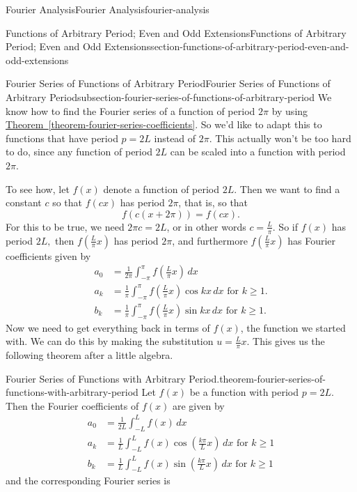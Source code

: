 \documentclass[oneside,10pt,]{book}
\numberwithin{equation}{section}
\newcommand{\amp}{&}
\begin{document}
\begin{chapterptx}{Fourier Analysis}{}{Fourier Analysis}{}{}{fourier-analysis}
\begin{sectionptx}{Functions of Arbitrary Period; Even and Odd Extensions}{}{Functions of Arbitrary Period; Even and Odd Extensions}{}{}{section-functions-of-arbitrary-period-even-and-odd-extensions}
\begin{subsectionptx}{Fourier Series of Functions of Arbitrary Period}{}{Fourier Series of Functions of Arbitrary Period}{}{}{subsection-fourier-series-of-functions-of-arbitrary-period}
\hypertarget{p-588}{}%
We know how to find the Fourier series of a function of period \(2\pi\) by using \hyperref[theorem-fourier-series-coefficients]{Theorem~\ref{theorem-fourier-series-coefficients}}. So we'd like to adapt this to functions that have period \(p = 2L\) instead of \(2\pi\). This actually won't be too hard to do, since any function of period \(2L\) can be scaled into a function with period \(2\pi\).%
\par
\hypertarget{p-589}{}%
To see how, let \(f(x)\) denote a function of period \(2L\). Then we want to find a constant \(c\) so that \(f(cx)\) has period \(2\pi\), that is, so that%
\begin{equation*}
f(c(x+2\pi)) = f(cx).
\end{equation*}
For this to be true, we need \(2\pi c = 2L\), or in other words \(c = \frac{L}{\pi}\). So if \(f(x)\) has period \(2L,\) then \(f(\frac{L}{\pi}x)\) has period \(2\pi\), and furthermore \(f(\frac{L}{\pi}x)\) has Fourier coefficients given by%
\begin{align*}
a_{0} \amp= \frac{1}{2\pi}\int_{-\pi}^{\pi}f\left(\frac{L}{\pi}x\right)\,dx\\
a_{k} \amp= \frac{1}{\pi}\int_{-\pi}^{\pi}f\left(\frac{L}{\pi}x\right)\cos kx\,dx\text{ for $k\geq1$.}\\
b_{k} \amp= \frac{1}{\pi}\int_{-\pi}^{\pi}f\left(\frac{L}{\pi}x\right)\sin kx\,dx\text{ for $k\geq1$.}
\end{align*}
Now we need to get everything back in terms of \(f(x)\), the function we started with. We can do this by making the substitution \(u = \frac{L}{\pi}x\). This gives us the following theorem after a little algebra.%
\begin{theorem}{Fourier Series of Functions with Arbitrary Period.}{}{theorem-fourier-series-of-functions-with-arbitrary-period}%
\hypertarget{p-590}{}%
Let \(f(x)\) be a function with period \(p = 2L\). Then the Fourier coefficients of \(f(x)\) are given by%
\begin{align*}
a_{0} \amp= \frac{1}{2L}\int_{-L}^{L}f\left(x\right)\,dx\\
a_{k} \amp= \frac{1}{L}\int_{-L}^{L}f\left(x\right)\cos\left(\frac{k\pi}{L}x\right)\,dx\text{ for $k\geq1$}\\
b_{k} \amp= \frac{1}{L}\int_{-L}^{L}f\left(x\right)\sin\left(\frac{k\pi}{L}x\right)\,dx\text{ for $k\geq1$}
\end{align*}
and the corresponding Fourier series is%
\begin{equation*}

\end{equation*}
\end{theorem}
\end{subsectionptx}
\end{sectionptx}
\end{chapterptx}
\end{document}
